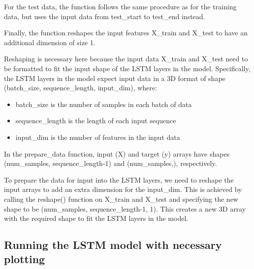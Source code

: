 \documentclass[11pt]{article}
\providecommand{\tightlist}{%
      \setlength{\itemsep}{0pt}\setlength{\parskip}{0pt}}
\begin{document}
For the test data, the function follows the same procedure as for the
training data, but uses the input data from test\_start to test\_end
instead.

Finally, the function reshapes the input features X\_train and X\_test
to have an additional dimension of size 1.

Reshaping is necessary here because the input data X\_train and X\_test
need to be formatted to fit the input shape of the LSTM layers in the
model. Specifically, the LSTM layers in the model expect input data in a
3D format of shape (batch\_size, sequence\_length, input\_dim), where:

\begin{itemize}
\tightlist
\item
  batch\_size is the number of samples in each batch of data
\item
  sequence\_length is the length of each input sequence
\item
  input\_dim is the number of features in the input data
\end{itemize}

In the prepare\_data function, input (X) and target (y) arrays have
shapes (num\_samples, sequence\_length-1) and (num\_samples,),
respectively.

To prepare the data for input into the LSTM layers, we need to reshape
the input arrays to add an extra dimension for the input\_dim. This is
achieved by calling the reshape() function on X\_train and X\_test and
specifying the new shape to be (num\_samples, sequence\_length-1, 1).
This creates a new 3D array with the required shape to fit the LSTM
layers in the model.

    \hypertarget{running-the-lstm-model-with-necessary-plotting}{%
\subsection{Running the LSTM model with necessary
plotting}\label{running-the-lstm-model-with-necessary-plotting}}
\end{document}
